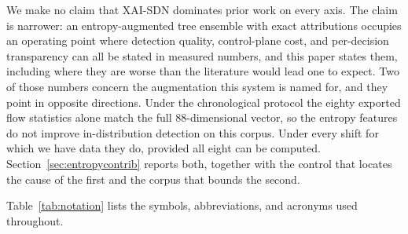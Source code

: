 \documentclass{ieeeaccess}
\begin{document}
We make no claim that XAI-SDN dominates prior work on every axis. The claim is narrower: an entropy-augmented tree ensemble with exact attributions occupies an operating point where detection quality, control-plane cost, and per-decision transparency can all be stated in measured numbers, and this paper states them, including where they are worse than the literature would lead one to expect. Two of those numbers concern the augmentation this system is named for, and they point in opposite directions. Under the chronological protocol the eighty exported flow statistics alone match the full 88-dimensional vector, so the entropy features do not improve in-distribution detection on this corpus. Under every shift for which we have data they do, provided all eight can be computed. Section~\ref{sec:entropycontrib} reports both, together with the control that locates the cause of the first and the corpus that bounds the second.

Table~\ref{tab:notation} lists the symbols, abbreviations, and acronyms used throughout.
\end{document}
